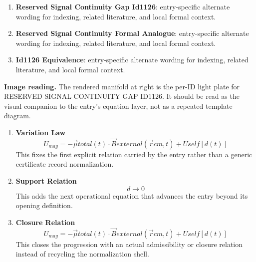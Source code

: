 \begin{enumerate}[leftmargin=1.6em,itemsep=6pt,topsep=4pt]
\item \textbf{Reserved Signal Continuity Gap Id1126}: entry-specific alternate wording for indexing, related literature, and local formal context.
\item \textbf{Reserved Signal Continuity Formal Analogue}: entry-specific alternate wording for indexing, related literature, and local formal context.
\item \textbf{Id1126 Equivalence}: entry-specific alternate wording for indexing, related literature, and local formal context.
\end{enumerate}

\begin{samepage}
\noindent\begin{minipage}[t]{0.45\linewidth}
\vspace{0pt}
\raggedright
\scriptsize\textbf{Image reading.} The rendered manifold at right is the per-ID light plate for RESERVED SIGNAL CONTINUITY GAP ID1126. It should be read as the visual companion to the entry's equation layer, not as a repeated template diagram.\par
\end{minipage}\hfill
\begin{minipage}[t]{0.53\linewidth}
\vspace*{-0.10in}
\raggedright
{}
\end{minipage}
\end{samepage}

\clearpage


\begin{enumerate}[leftmargin=1.6em,itemsep=9pt,topsep=6pt]
\item \textbf{Variation Law}
\[
U_{mag} = -\vec{\mu} {total}(t) \cdot \vec{B} {external}(\vec{r} {cm}, t) + U {self}[d(t)]
\]
This fixes the first explicit relation carried by the entry rather than a generic certificate record normalization.

\item \textbf{Support Relation}
\[
d \to 0
\]
This adds the next operational equation that advances the entry beyond its opening definition.

\item \textbf{Closure Relation}
\[
U_{mag} = -\vec{\mu} {total}(t) \cdot \vec{B} {external}(\vec{r} {cm}, t) + U {self}[d(t)]
\]
This closes the progression with an actual admissibility or closure relation instead of recycling the normalization shell.
\end{enumerate}

